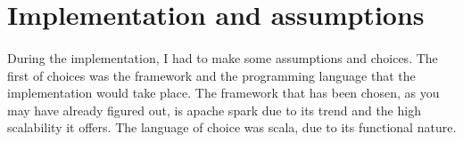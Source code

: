 \section{Implementation and assumptions}
\paragraph{}During the implementation, I had to make some assumptions and choices. The first of choices was the framework and the programming language that the implementation would take place. The framework that has been chosen, as you may have already figured out, is apache spark due to its trend and the high scalability it offers. The language of choice was scala, due to its functional nature.
